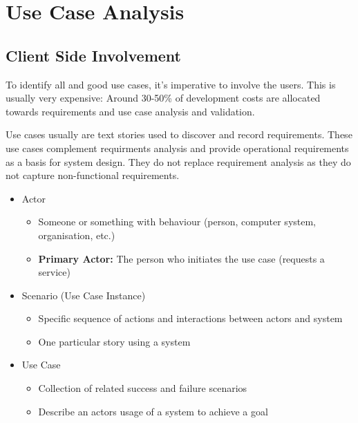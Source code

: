 \documentclass[
../../Software_Engineering_Summary.tex,
]
{subfiles}
\begin{document}
\section{Use Case Analysis}
\subsection{Client Side Involvement}
To identify all and good use cases, it's imperative to involve the users. This is usually very expensive: Around 30-50\% of development costs are allocated towards requirements and use case analysis and validation.

Use cases usually are text stories used to discover and record requirements. These use cases complement requirments analysis and provide operational requirements as a basis for system design. They do not replace requirement analysis as they do not capture non-functional requirements.

\begin{greenbox}
    \begin{itemize}
        \item Actor
        \begin{itemize}
            \item Someone or something with behaviour (person, computer system, organisation, etc.)
            \item \textbf{Primary Actor:} The person who initiates the use case (requests a service)
        \end{itemize}
        \item Scenario (Use Case Instance)
        \begin{itemize}
            \item Specific sequence of actions and interactions between actors and system
            \item One particular story using a system
        \end{itemize}
        \item Use Case
        \begin{itemize}
            \item Collection of related success and failure scenarios 
            \item Describe an actors usage of a system to achieve a goal
        \end{itemize}
    \end{itemize}
\end{greenbox}
\end{document}
